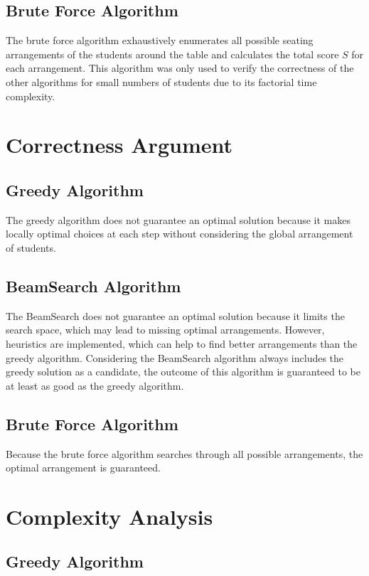 \documentclass[11pt]{article}
\begin{document}
\subsection{Brute Force Algorithm}

The brute force algorithm exhaustively enumerates all possible seating arrangements of the students around the table and calculates the total score $S$ for each arrangement.
This algorithm was only used to verify the correctness of the other algorithms for small numbers of students due to its factorial time complexity.

\section{Correctness Argument}

\subsection{Greedy Algorithm}

The greedy algorithm does not guarantee an optimal solution because it makes locally optimal choices at each step without considering the global arrangement of students.

\subsection{BeamSearch Algorithm}

The BeamSearch does not guarantee an optimal solution because it limits the search space, which may lead to missing optimal arrangements.
However, heuristics are implemented, which can help to find better arrangements than the greedy algorithm.
Considering the BeamSearch algorithm always includes the greedy solution as a candidate, the outcome of this algorithm is guaranteed to be at least as good as the greedy algorithm.

\subsection{Brute Force Algorithm}

Because the brute force algorithm searches through all possible arrangements, the optimal arrangement is guaranteed.

\section{Complexity Analysis}

\subsection{Greedy Algorithm}
\end{document}
